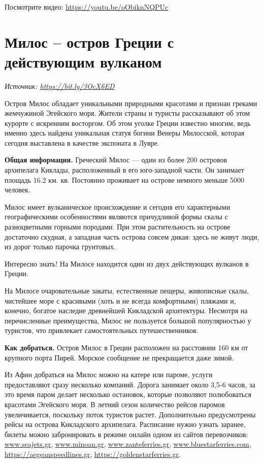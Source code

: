 Посмотрите видео: \url{https://youtu.be/oObiknNQPUc}



\newpage
\section{Милос – остров Греции с действующим вулканом}

\textit{Источник: \url{https://bit.ly/3OcX6ED}}

Остров Милос обладает уникальными природными красотами и признан греками жемчужиной Эгейского моря. Жители страны и туристы рассказывают об этом курорте с искренним восторгом. Об этом уголке Греции известно многим, ведь именно здесь найдена уникальная статуя богини Венеры Милосской, которая сегодня выставлена в качестве экспоната в Лувре.

\textbf{Общая информация.}
Греческий Милос — один из более 200 островов архипелага Киклады, расположенный в его юго-западной части. Он занимает площадь 16.2 км. кв. Постоянно проживает на острове немного меньше 5000 человек.

Милос имеет вулканическое происхождение и сегодня его характерными географическими особенностями являются причудливой формы скалы с разноцветными горными породами. При этом растительность на острове достаточно скудная, а западная часть острова совсем дикая: здесь не живут люди, из дорог только парочка грунтовых.

\begin{fancyquotes}
    Интересно знать! На Милосе находится один из двух действующих вулканов в Греции.
\end{fancyquotes}

На Милосе очаровательные закаты, естественные пещеры, живописные скалы, чистейшее море с красивыми (хоть и не всегда комфортными) пляжами и, конечно, богатое наследие древнейшей Кикладской архитектуры. Несмотря на перечисленные преимущества, Милос не пользуется большой популярностью у туристов, что привлекает самостоятельных путешественников.


\textbf{Как добраться.}
Остров Милос в Греции расположен на расстоянии 160 км от крупного порта Пирей. Морское сообщение не прекращается даже зимой.

Из Афин добраться на Милос можно на катере или пароме, услуги предоставляют сразу несколько компаний. Дорога занимает около 3,5-6 часов, за это время паром делает несколько остановок, которые позволяют полюбоваться красотами Эгейского моря. В летний сезон количество рейсов паромов увеличивается, поскольку поток туристов растет. Дополнительно предусмотрены рейсы на острова Кикладского архипелага. Расписание нужно узнать заранее, билеты можно забронировать в режиме онлайн одном из сайтов перевозчиков: \url{www.seajets.gr}, \url{www.minoan.gr}, \url{www.zanteferries.gr}, \url{www.bluestarferries.com}, \url{https://aegeanspeedlines.gr}, \url{https://goldenstarferries.gr}.

